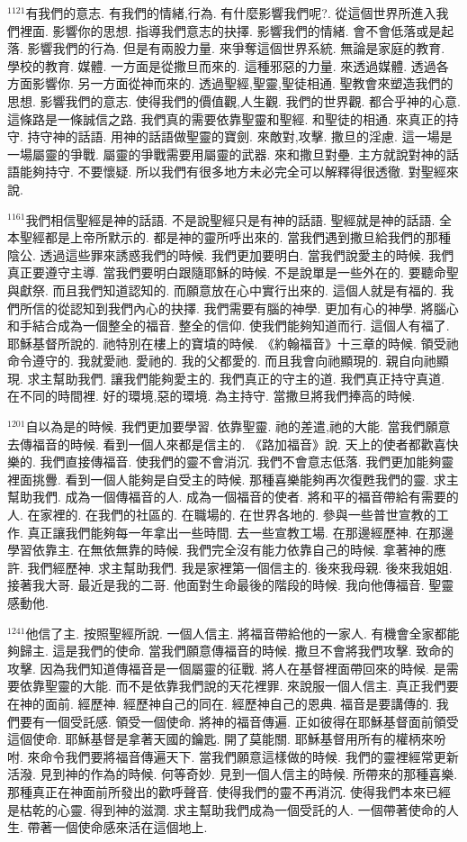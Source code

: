 \documentclass{book}
\begin{document}
$^{1121}$有我們的意志.
有我們的情緒,行為.
有什麼影響我們呢?.
從這個世界所進入我們裡面.
影響你的思想.
指導我們意志的抉擇.
影響我們的情緒.
會不會低落或是起落.
影響我們的行為.
但是有兩股力量.
來爭奪這個世界系統.
無論是家庭的教育.
學校的教育.
媒體.
一方面是從撒旦而來的.
這種邪惡的力量.
來透過媒體.
透過各方面影響你.
另一方面從神而來的.
透過聖經,聖靈,聖徒相通.
聖教會來塑造我們的思想.
影響我們的意志.
使得我們的價值觀,人生觀.
我們的世界觀.
都合乎神的心意.
這條路是一條誠信之路.
我們真的需要依靠聖靈和聖經.
和聖徒的相通.
來真正的持守.
持守神的話語.
用神的話語做聖靈的寶劍.
來敵對,攻擊.
撒旦的淫慮.
這一場是一場屬靈的爭戰.
屬靈的爭戰需要用屬靈的武器.
來和撒旦對壘.
主方就說對神的話語能夠持守.
不要懷疑.
所以我們有很多地方未必完全可以解釋得很透徹.
對聖經來說.

$^{1161}$我們相信聖經是神的話語.
不是說聖經只是有神的話語.
聖經就是神的話語.
全本聖經都是上帝所默示的.
都是神的靈所呼出來的.
當我們遇到撒旦給我們的那種陰公.
透過這些罪來誘惑我們的時候.
我們更加要明白.
當我們說愛主的時候.
我們真正要遵守主導.
當我們要明白跟隨耶穌的時候.
不是說單是一些外在的.
要聽命聖與獻祭.
而且我們知道認知的.
而願意放在心中實行出來的.
這個人就是有福的.
我們所信的從認知到我們內心的抉擇.
我們需要有腦的神學.
更加有心的神學.
將腦心和手結合成為一個整全的福音.
整全的信仰.
使我們能夠知道而行.
這個人有福了.
耶穌基督所說的.
祂特別在樓上的寶墳的時候.
《約翰福音》十三章的時候.
領受祂命令遵守的.
我就愛祂.
愛祂的.
我的父都愛的.
而且我會向祂顯現的.
親自向祂顯現.
求主幫助我們.
讓我們能夠愛主的.
我們真正的守主的道.
我們真正持守真道.
在不同的時間裡.
好的環境,惡的環境.
為主持守.
當撒旦將我們捧高的時候.

$^{1201}$自以為是的時候.
我們更加要學習.
依靠聖靈.
祂的差遣,祂的大能.
當我們願意去傳福音的時候.
看到一個人來都是信主的.
《路加福音》說.
天上的使者都歡喜快樂的.
我們直接傳福音.
使我們的靈不會消沉.
我們不會意志低落.
我們更加能夠靈裡面挑釁.
看到一個人能夠是自受主的時候.
那種喜樂能夠再次復甦我們的靈.
求主幫助我們.
成為一個傳福音的人.
成為一個福音的使者.
將和平的福音帶給有需要的人.
在家裡的.
在我們的社區的.
在職場的.
在世界各地的.
參與一些普世宣教的工作.
真正讓我們能夠每一年拿出一些時間.
去一些宣教工場.
在那邊經歷神.
在那邊學習依靠主.
在無依無靠的時候.
我們完全沒有能力依靠自己的時候.
拿著神的應許.
我們經歷神.
求主幫助我們.
我是家裡第一個信主的.
後來我母親.
後來我姐姐.
接著我大哥.
最近是我的二哥.
他面對生命最後的階段的時候.
我向他傳福音.
聖靈感動他.

$^{1241}$他信了主.
按照聖經所說.
一個人信主.
將福音帶給他的一家人.
有機會全家都能夠歸主.
這是我們的使命.
當我們願意傳福音的時候.
撒旦不會將我們攻擊.
致命的攻擊.
因為我們知道傳福音是一個屬靈的征戰.
將人在基督裡面帶回來的時候.
是需要依靠聖靈的大能.
而不是依靠我們說的天花裡罪.
來說服一個人信主.
真正我們要在神的面前.
經歷神.
經歷神自己的同在.
經歷神自己的恩典.
福音是要講傳的.
我們要有一個受託感.
領受一個使命.
將神的福音傳遍.
正如彼得在耶穌基督面前領受這個使命.
耶穌基督是拿著天國的鑰匙.
開了莫能關.
耶穌基督用所有的權柄來吩咐.
來命令我們要將福音傳遍天下.
當我們願意這樣做的時候.
我們的靈裡經常更新活潑.
見到神的作為的時候.
何等奇妙.
見到一個人信主的時候.
所帶來的那種喜樂.
那種真正在神面前所發出的歡呼聲音.
使得我們的靈不再消沉.
使得我們本來已經是枯乾的心靈.
得到神的滋潤.
求主幫助我們成為一個受託的人.
一個帶著使命的人生.
帶著一個使命感來活在這個地上.
\end{document}
